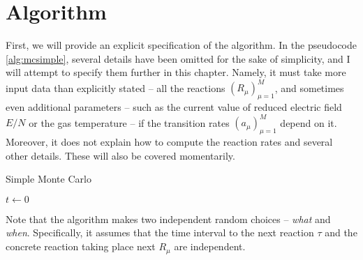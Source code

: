 
\section{Algorithm}

First, we will provide an explicit specification of the algorithm. In the pseudocode \ref{alg:mcsimple}, several details have been omitted for the sake of simplicity, and I will attempt to specify them further in this chapter. Namely, it must take more input data than explicitly stated -- all the reactions $(R_\mu)_{\mu=1}^M$, and sometimes even additional parameters -- such as the current value of reduced electric field $E/N$ or the gas temperature -- if the transition rates $(a_\mu)_{\mu=1}^M$ depend on it. Moreover, it does not explain how to compute the reaction rates and several other details. These will also be covered momentarily.

\begin{algorithm}
\caption{Simple Monte Carlo}\label{alg:mcsimple}

$t \gets 0$\\
\end{algorithm}

Note that the algorithm makes two independent random choices -- \textit{what} and \textit{when}. Specifically, it assumes that the time interval to the next reaction $\tau$ and the concrete reaction taking place next $R_\mu$ are independent.

